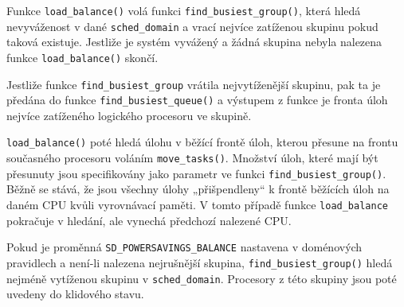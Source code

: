 \documentclass[a4paper,12pt]{article}
\begin{document}
Funkce \verb#load_balance()# volá funkci \verb#find_busiest_group()#, která hledá nevyváženost v dané \verb#sched_domain# a vrací nejvíce zatíženou skupinu pokud taková existuje. Jestliže je systém vyvážený a žádná skupina nebyla nalezena funkce \verb#load_balance()# skončí.

Jestliže funkce \verb#find_busiest_group# vrátila nejvytíženější skupinu, pak ta je předána do funkce \verb#find_busiest_queue()# a výstupem z funkce je fronta úloh nejvíce zatíženého logického procesoru ve skupině.

\verb#load_balance()# poté hledá úlohu v běžící frontě úloh, kterou přesune na frontu současného procesoru voláním \verb#move_tasks()#. Množství úloh, které mají být přesunuty jsou specifikovány jako parametr ve funkci \newline \verb#find_busiest_group()#. Běžně se stává, že jsou všechny úlohy „přišpendleny“ k frontě běžících úloh na daném CPU kvůli vyrovnávací paměti. V tomto případě funkce \verb#load_balance# pokračuje v hledání, ale vynechá předchozí nalezené CPU.

Pokud je proměnná \verb#SD_POWERSAVINGS_BALANCE# nastavena v doménových pravidlech a není-li nalezena nejrušnější skupina, \verb#find_busiest_group()# hledá nejméně vytíženou skupinu v \verb#sched_domain#. Procesory z této skupiny jsou poté uvedeny do klidového stavu. 
\end{document}
